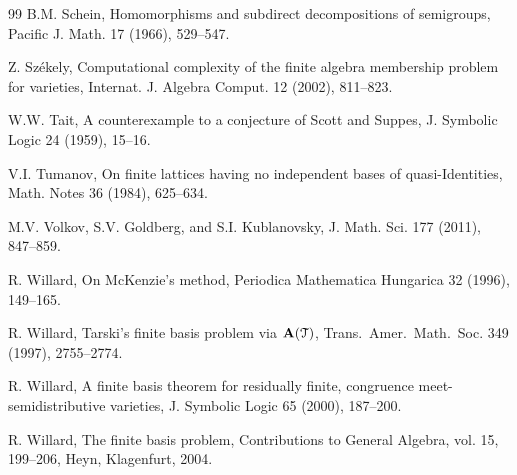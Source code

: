 \documentclass[reqno]{amsart}
\theoremstyle{plain}
\theoremstyle{definition}
\begin{document}
\begin{thebibliography}{99}
 B.M. Schein, Homomorphisms and subdirect decompositions of semigroups, Pacific J. Math. 17 (1966), 529--547.

 Z. Sz\'ekely, Computational complexity of the finite algebra membership problem for varieties, Internat. J. Algebra Comput. 12 (2002), 811--823.

 W.W. Tait, A counterexample to a conjecture of Scott and Suppes, J. Symbolic Logic 24 (1959), 15--16.

 V.I. Tumanov, On finite lattices having no independent
bases of quasi-Identities, Math. Notes 36 (1984), 625--634.

 M.V. Volkov, S.V. Goldberg, and S.I. Kublanovsky, J. Math. Sci. 177 (2011), 847--859.

 R. Willard, On McKenzie's method, Periodica Mathematica Hungarica 32 (1996), 149--165.

R. Willard, Tarski's finite basis problem
via ${\bf A}(\mathcal{T})$, {Trans.\ Amer.\ Math.\ Soc.} {349} (1997), 2755--2774.

 R. Willard, A finite basis theorem for residually finite, congruence meet-semidistributive varieties, J. Symbolic Logic 65 (2000), 187--200.


 R. Willard, The finite basis problem, Contributions to General Algebra, vol. 15, 199--206, Heyn, Klagenfurt, 2004.



\end{thebibliography}



\end{document}
